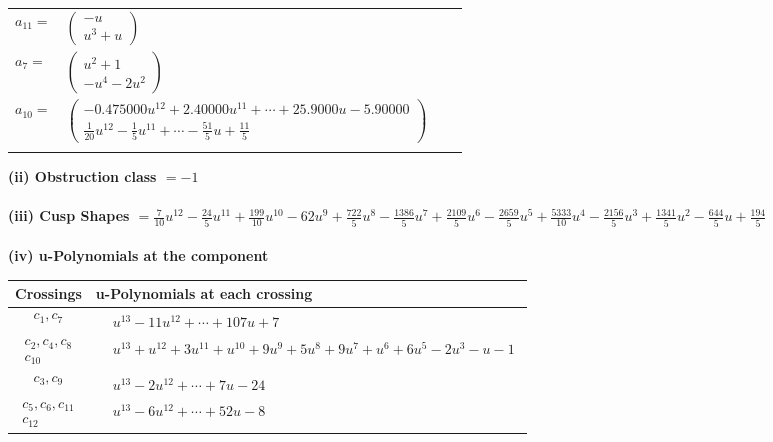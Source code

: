 \documentclass[1p]{elsarticle_modified}
\theoremstyle{definition}
\begin{document}
\begin{tabular}{m{7pt} m{180pt} m{7pt} m{180pt} }
\flushright $a_{11}=$&$\begin{pmatrix}- u\\u^3+u\end{pmatrix}$ \\
\flushright $a_{7}=$&$\begin{pmatrix}u^2+1\\- u^4-2 u^2\end{pmatrix}$ \\
\flushright $a_{10}=$&$\begin{pmatrix}-0.475000 u^{12}+2.40000 u^{11}+\cdots+25.9000 u-5.90000\\\frac{1}{20} u^{12}-\frac{1}{5} u^{11}+\cdots-\frac{51}{5} u+\frac{11}{5}\end{pmatrix}$\\&\end{tabular}
\flushleft \textbf{(ii) Obstruction class $= -1$}\\~\\
\flushleft \textbf{(iii) Cusp Shapes $= \frac{7}{10} u^{12}-\frac{24}{5} u^{11}+\frac{199}{10} u^{10}-62 u^9+\frac{722}{5} u^8-\frac{1386}{5} u^7+\frac{2109}{5} u^6-\frac{2659}{5} u^5+\frac{5333}{10} u^4-\frac{2156}{5} u^3+\frac{1341}{5} u^2-\frac{644}{5} u+\frac{194}{5}$}\\~\\
\newpage\renewcommand{\arraystretch}{1}
\flushleft \textbf{(iv) u-Polynomials at the component}\newline \\
\begin{tabular}{m{50pt}|m{274pt}}
Crossings & \hspace{64pt}u-Polynomials at each crossing \\
\hline $$\begin{aligned}c_{1},c_{7}\end{aligned}$$&$\begin{aligned}
&u^{13}-11 u^{12}+\cdots+107 u+7
\end{aligned}$\\
\hline $$\begin{aligned}c_{2},c_{4},c_{8}\\c_{10}\end{aligned}$$&$\begin{aligned}
&u^{13}+u^{12}+3 u^{11}+u^{10}+9 u^9+5 u^8+9 u^7+u^6+6 u^5-2 u^3- u-1
\end{aligned}$\\
\hline $$\begin{aligned}c_{3},c_{9}\end{aligned}$$&$\begin{aligned}
&u^{13}-2 u^{12}+\cdots+7 u-24
\end{aligned}$\\
\hline $$\begin{aligned}c_{5},c_{6},c_{11}\\c_{12}\end{aligned}$$&$\begin{aligned}
&u^{13}-6 u^{12}+\cdots+52 u-8
\end{aligned}$\\
\hline
\end{tabular}\\~\\
\end{document}
